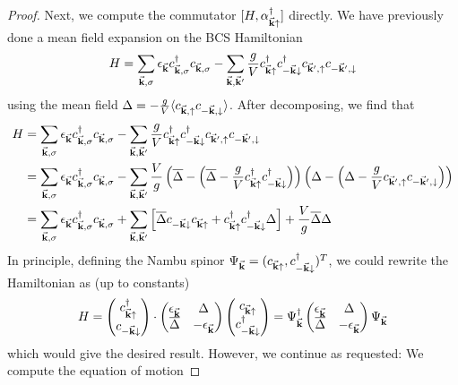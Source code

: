 \begin{proof}
	Next, we compute the commutator $[H, \alpha_{\va k\uparrow}^\dagger]$ directly. We have previously done a mean field expansion on the BCS Hamiltonian
	\[H = \sum_{\va k,\sigma}\epsilon_{\va k}  c_{\va k,\sigma}^\dagger c_{\va k,\sigma} -\sum_{\va k, \va k'}\frac{g}{V} c_{\va k\uparrow}^\dagger c_{-\va k\downarrow}^\dagger c_{\va k',\uparrow} c_{-\va k', \downarrow} \]
	using the mean field $\Delta = -\frac{g}{V}\langle c_{\va k,\uparrow}c_{-\va k,\downarrow}\rangle$. After decomposing, we find that
	\begin{align*}
		H &= \sum_{\va k,\sigma}\epsilon_{\va k}  c_{\va k,\sigma}^\dagger c_{\va k,\sigma} -\sum_{\va k, \va k'}\frac{g}{V} c_{\va k\uparrow}^\dagger c_{-\va k\downarrow}^\dagger c_{\va k',\uparrow} c_{-\va k', \downarrow} \\
		&= \sum_{\va k,\sigma}\epsilon_{\va k}  c_{\va k,\sigma}^\dagger c_{\va k,\sigma} -\sum_{\va k, \va k'}\frac{V}{g} \left(\overline{\Delta} -\left(\overline{\Delta}-\frac{g}{V}c_{\va k\uparrow}^\dagger c_{-\va k\downarrow}^\dagger\right)\right)\left(\Delta - \left(\Delta - \frac{g}{V}c_{\va k',\uparrow} c_{-\va k', \downarrow}\right)\right)\\
		&= \sum_{\va k,\sigma}\epsilon_{\va k}  c_{\va k,\sigma}^\dagger c_{\va k,\sigma} +\sum_{\va k, \va k'}\left[\overline{\Delta}c_{-\va k \downarrow}c_{\va k\uparrow}+c_{\va k\uparrow}^\dagger c_{-\va k\downarrow}^\dagger \Delta\right]+\frac{V}{g}\overline{\Delta}\Delta
	\end{align*}
In principle, defining the Nambu spinor $\Psi_{\va k} = (c_{\va k \uparrow}, c_{-\va k\downarrow}^\dagger)^T$, we could rewrite the Hamiltonian as (up to constants)
\[H = \begin{pmatrix}
	c_{\va k \uparrow}^\dagger \\ c_{-\va k\downarrow}
\end{pmatrix}\cdot\begin{pmatrix}
	\epsilon_{\va k} & \Delta \\
	\overline{\Delta} & -\epsilon_{\va k}
\end{pmatrix}\begin{pmatrix}
c_{\va k \uparrow} \\ c_{-\va k\downarrow}^\dagger
\end{pmatrix} = \Psi_{\va k}^\dagger \begin{pmatrix}
	\epsilon_{\va k} & \Delta \\
	\overline{\Delta} & -\epsilon_{\va k}
\end{pmatrix}\Psi_{\va k}\]
which would give the desired result. However, we continue as requested: We compute the equation of motion

\end{proof}
